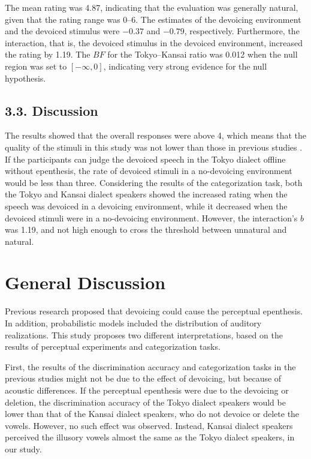 \documentclass[a4paper,11pt,twocolumn]{article}
\begin{document}
The mean rating was 4.87, indicating that the evaluation was generally natural, given that the rating range was 0--6. The estimates of the devoicing environment and the devoiced stimulus were $-0.37$ and $-0.79$, respectively. Furthermore, the interaction, that is, the devoiced stimulus in the devoiced environment, increased the rating by 1.19. The $BF$ for the Tokyo--Kansai ratio was 0.012 when the null region was set to $[-\infty, 0]$, indicating very strong evidence for the null hypothesis.

\subsection{3.3. Discussion}

The results showed that the overall responses were above 4, which means that the quality of the stimuli in this study was not lower than those in previous studies \cite{kilpatrick2018japanese}. If the participants can judge the devoiced speech in the Tokyo dialect offline without epenthesis, the rate of devoiced stimuli in a no-devoicing environment would be less than three. Considering the results of the categorization task, both the Tokyo and Kansai dialect speakers showed the increased rating when the speech was devoiced in a devoicing environment, while it decreased when the devoiced stimuli were in a no-devoicing environment. However, the interaction's $b$ was 1.19, and not high enough to cross the threshold between unnatural and natural.

\section{General Discussion}

Previous research proposed that devoicing could cause the perceptual epenthesis. In addition, probabilistic models included the distribution of auditory realizations. This study proposes two different interpretations, based on the results of perceptual experiments and categorization tasks.

First, the results of the discrimination accuracy and categorization tasks in the previous studies might not be due to the effect of devoicing, but because of acoustic differences. If the perceptual epenthesis were due to the devoicing or deletion, the discrimination accuracy of the Tokyo dialect speakers would be lower than that of the Kansai dialect speakers, who do not devoice or delete the vowels. However, no such effect was observed. Instead, Kansai dialect speakers perceived the illusory vowels almost the same as the Tokyo dialect speakers, in our study.
\end{document}
